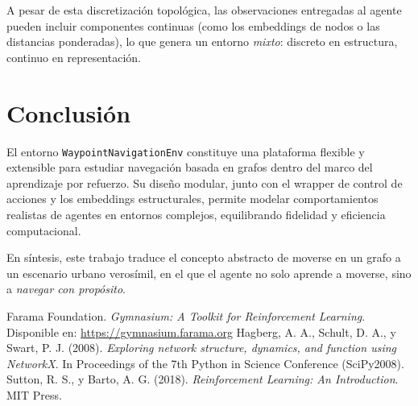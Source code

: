 \documentclass[11pt,a4paper]{article}
\begin{document}
A pesar de esta discretización topológica, las observaciones entregadas al agente pueden incluir componentes continuas (como los embeddings de nodos o las distancias ponderadas), lo que genera un entorno \textit{mixto}: discreto en estructura, continuo en representación.

\section{Conclusión}

El entorno \texttt{WaypointNavigationEnv} constituye una plataforma flexible y extensible para estudiar navegación basada en grafos dentro del marco del aprendizaje por refuerzo. Su diseño modular, junto con el wrapper de control de acciones y los embeddings estructurales, permite modelar comportamientos realistas de agentes en entornos complejos, equilibrando fidelidad y eficiencia computacional. 

En síntesis, este trabajo traduce el concepto abstracto de moverse en un grafo a un escenario urbano verosímil, en el que el agente no solo aprende a moverse, sino a \textit{navegar con propósito}.


\begin{thebibliography}{9}
 Farama Foundation. \textit{Gymnasium: A Toolkit for Reinforcement Learning}. Disponible en: \url{https://gymnasium.farama.org}
 Hagberg, A. A., Schult, D. A., y Swart, P. J. (2008). \textit{Exploring network structure, dynamics, and function using NetworkX}. In Proceedings of the 7th Python in Science Conference (SciPy2008).
 Sutton, R. S., y Barto, A. G. (2018). \textit{Reinforcement Learning: An Introduction}. MIT Press.
\end{thebibliography}
\end{document}
